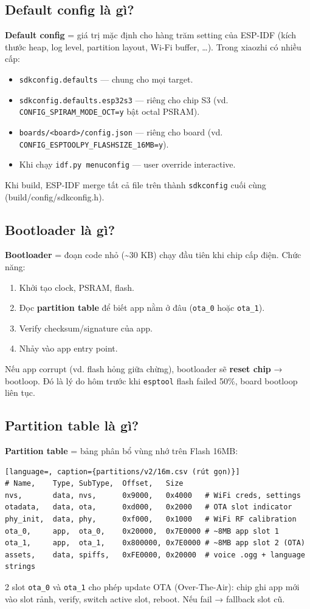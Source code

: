 \documentclass[11pt,a4paper]{article}
\begin{document}
\subsection{Default config là gì?}
\textbf{Default config} = giá trị mặc định cho hàng trăm setting của ESP-IDF (kích thước heap, log level, partition layout, Wi-Fi buffer, \ldots). Trong xiaozhi có nhiều cấp:
\begin{itemize}
  \item \texttt{sdkconfig.defaults} — chung cho mọi target.
  \item \texttt{sdkconfig.defaults.esp32s3} — riêng cho chip S3 (vd. \texttt{CONFIG\_SPIRAM\_MODE\_OCT=y} bật octal PSRAM).
  \item \texttt{boards/<board>/config.json} — riêng cho board (vd. \texttt{CONFIG\_ESPTOOLPY\_FLASHSIZE\_16MB=y}).
  \item Khi chạy \texttt{idf.py menuconfig} — user override interactive.
\end{itemize}
Khi build, ESP-IDF merge tất cả file trên thành \texttt{sdkconfig} cuối cùng (build/config/sdkconfig.h).

\subsection{Bootloader là gì?}
\textbf{Bootloader} = đoạn code nhỏ (\textasciitilde 30 KB) chạy đầu tiên khi chip cấp điện. Chức năng:
\begin{enumerate}
  \item Khởi tạo clock, PSRAM, flash.
  \item Đọc \textbf{partition table} để biết app nằm ở đâu (\texttt{ota\_0} hoặc \texttt{ota\_1}).
  \item Verify checksum/signature của app.
  \item Nhảy vào app entry point.
\end{enumerate}
Nếu app corrupt (vd. flash hỏng giữa chừng), bootloader sẽ \textbf{reset chip} → bootloop. Đó là lý do hôm trước khi \texttt{esptool} flash failed 50\%, board bootloop liên tục.

\subsection{Partition table là gì?}
\textbf{Partition table} = bảng phân bổ vùng nhớ trên Flash 16MB:
\begin{lstlisting}[language=, caption={partitions/v2/16m.csv (rút gọn)}]
# Name,    Type, SubType,  Offset,   Size
nvs,       data, nvs,      0x9000,   0x4000   # WiFi creds, settings
otadata,   data, ota,      0xd000,   0x2000   # OTA slot indicator
phy_init,  data, phy,      0xf000,   0x1000   # WiFi RF calibration
ota_0,     app,  ota_0,    0x20000,  0x7E0000 # ~8MB app slot 1
ota_1,     app,  ota_1,    0x800000, 0x7E0000 # ~8MB app slot 2 (OTA)
assets,    data, spiffs,   0xFE0000, 0x20000  # voice .ogg + language strings
\end{lstlisting}
2 slot \texttt{ota\_0} và \texttt{ota\_1} cho phép update OTA (Over-The-Air): chip ghi app mới vào slot rảnh, verify, switch active slot, reboot. Nếu fail → fallback slot cũ.
\end{document}
